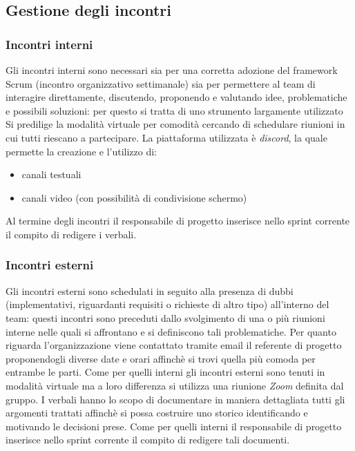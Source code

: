         
    \subsection{Gestione degli incontri}
        \subsubsection{Incontri interni}
        Gli incontri interni sono necessari sia per una corretta adozione del framework Scrum (incontro organizzativo settimanale)
        sia per permettere al team di interagire direttamente, discutendo, proponendo e valutando idee, problematiche e possibili 
        soluzioni: per questo si tratta di uno strumento largamente utilizzato
        \newline
        Si predilige la modalità virtuale per comodità cercando di schedulare riunioni in cui tutti riescano a partecipare.
        \newline
        La piattaforma utilizzata è \textit{discord}, la quale permette la creazione e l'utilizzo di:
        \begin{itemize}
            \item canali testuali
            \item canali video (con possibilità di condivisione schermo)
        \end{itemize}
        Al termine degli incontri il responsabile di progetto inserisce nello sprint corrente il compito di redigere i verbali. 

        \subsubsection{Incontri esterni}
        Gli incontri esterni sono schedulati in seguito alla presenza di dubbi (implementativi, riguardanti requisiti o richieste di altro tipo) all'interno del 
        team: questi incontri sono preceduti dallo svolgimento di una o più riunioni interne nelle quali si affrontano e si definiscono tali problematiche.
        \newline
        Per quanto riguarda l'organizzazione viene contattato tramite email il referente di progetto proponendogli diverse date e orari affinchè si trovi quella 
        più comoda per entrambe le parti. 
        \newline
        Come per quelli interni gli incontri esterni sono tenuti in modalità virtuale ma a loro differenza si utilizza una riunione \textit{Zoom} definita dal gruppo. 
        \newline
        I verbali hanno lo scopo di documentare in maniera dettagliata tutti gli argomenti trattati affinchè si possa costruire uno storico identificando
        e motivando le decisioni prese.
        \newline
        Come per quelli interni il responsabile di progetto inserisce nello sprint corrente il compito di redigere tali documenti.

